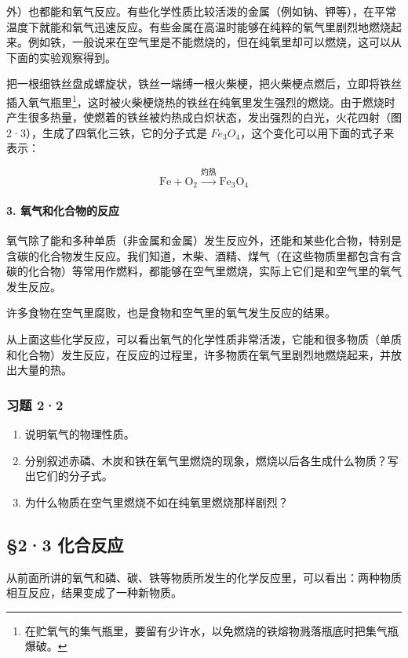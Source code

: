 外）也都能和氧气反应。有些化学性质比较活泼的金属（例如钠、钾等），在平常温度下就能和氧气迅速反应。有些金属在高温时能够在纯粹的氧气里剧烈地燃烧起来。例如铁，一般说来在空气里是不能燃烧的，但在纯氧里却可以燃烧，这可以从下面的实验观察得到。

把一根细铁丝盘成螺旋状，铁丝一端缚一根火柴梗，把火柴梗点燃后，立即将铁丝插入氧气瓶里\footnote{在贮氧气的集气瓶里，要留有少许水，以免燃烧的铁熔物溅落瓶底时把集气瓶爆破。}，这时被火柴梗烧热的铁丝在纯氧里发生强烈的燃烧。由于燃烧时产生很多热量，使燃着的铁丝被灼热成白炽状态，发出强烈的白光，火花四射（图2·3），生成了四氧化三铁，它的分子式是
\(Fe_{3}O_{4}\)，这个变化可以用下面的式子来表示：

\[
\mathrm{Fe}+\mathrm{O}_{2}\xrightarrow{\text{灼热}}\mathrm{Fe}_{3}\mathrm{O}_{4}
\]

\paragraph{3. 氧气和化合物的反应}

氧气除了能和多种单质（非金属和金属）发生反应外，还能和某些化合物，特别是含碳的化合物发生反应。我们知道，木柴、酒精、煤气（在这些物质里都包含有含碳的化合物）等常用作燃料，都能够在空气里燃烧，实际上它们是和空气里的氧气发生反应。

许多食物在空气里腐败，也是食物和空气里的氧气发生反应的结果。

从上面这些化学反应，可以看出氧气的化学性质非常活泼，它能和很多物质（单质和化合物）发生反应，在反应的过程里，许多物质在氧气里剧烈地燃烧起来，并放出大量的热。

\subsubsection{习题 2·2}

\begin{enumerate}
\item
  说明氧气的物理性质。
\item
  分别叙述赤磷、木炭和铁在氧气里燃烧的现象，燃烧以后各生成什么物质？写出它们的分子式。
\item
  为什么物质在空气里燃烧不如在纯氧里燃烧那样剧烈？
\end{enumerate}

\subsection{§2·3 化合反应}

从前面所讲的氧气和磷、碳、铁等物质所发生的化学反应里，可以看出：两种物质相互反应，结果变成了一种新物质。

